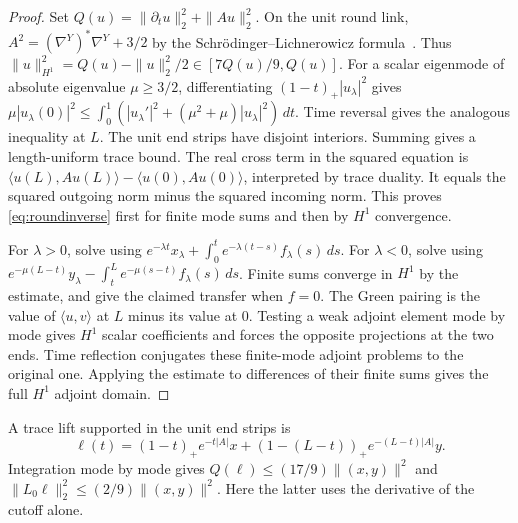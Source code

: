 \documentclass[11pt]{article}
\theoremstyle{remark}
\newcommand{\ip}[2]{\langle #1,#2\rangle}
\begin{document}
\begin{proof}
Set \(Q(u)=\|\partial_tu\|_2^2+\|Au\|_2^2\). On the unit round link, \(A^2=(\nabla^Y)^*\nabla^Y+3/2\) by the Schr\"odinger--Lichnerowicz formula~\cite[proof of Theorem~2.6]{FriedrichKim1999Hijazi}. Thus \(\|u\|_{H^1}^2=Q(u)-\|u\|_2^2/2\in[7Q(u)/9,Q(u)]\). For a scalar eigenmode of absolute eigenvalue \(\mu\ge3/2\), differentiating \((1-t)_+|u_\lambda|^2\) gives
\(\mu|u_\lambda(0)|^2\le\int_0^1(|u_\lambda'|^2+(\mu^2+\mu)|u_\lambda|^2)\,dt\).
Time reversal gives the analogous inequality at \(L\). The unit end strips have disjoint interiors. Summing gives a length-uniform trace bound. The real cross term in the squared equation is
\(\ip{u(L)}{Au(L)}-\ip{u(0)}{Au(0)}\), interpreted by trace duality. It equals the squared outgoing norm minus the squared incoming norm. This proves \eqref{eq:roundinverse} first for finite mode sums and then by \(H^1\) convergence.

For \(\lambda>0\), solve using \(e^{-\lambda t}x_\lambda+\int_0^t e^{-\lambda(t-s)}f_\lambda(s)\,ds\). For \(\lambda<0\), solve using \(e^{-\mu(L-t)}y_\lambda-\int_t^L e^{-\mu(s-t)}f_\lambda(s)\,ds\). Finite sums converge in \(H^1\) by the estimate, and give the claimed transfer when \(f=0\). The Green pairing is the value of \(\ip{u}{v}\) at \(L\) minus its value at \(0\). Testing a weak adjoint element mode by mode gives \(H^1\) scalar coefficients and forces the opposite projections at the two ends. Time reflection conjugates these finite-mode adjoint problems to the original one. Applying the estimate to differences of their finite sums gives the full \(H^1\) adjoint domain.
\end{proof}

A trace lift supported in the unit end strips is
\[
 \ell(t)=(1-t)_+e^{-t|A|}x+(1-(L-t))_+ e^{-(L-t)|A|}y.
\]
Integration mode by mode gives \(Q(\ell)\le(17/9)\|(x,y)\|^2\) and \(\|L_0\ell\|_2^2\le(2/9)\|(x,y)\|^2\). Here the latter uses the derivative of the cutoff alone.
\end{document}

